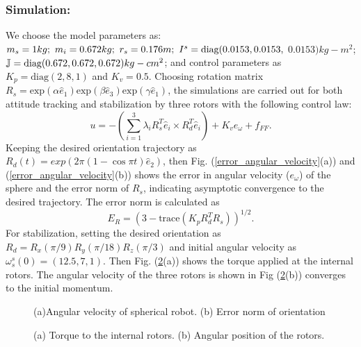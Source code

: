 \documentclass{ifacconf}
\begin{document}
\subsubsection*{Simulation:}
\label{section_simu}
We choose the model parameters as: $m_{s} = 1kg;~ m_{i}= 0.672kg;~ r_s = 0.176m;~I^{s} = \hbox{diag}(0.0153,0.0153,$ $0.0153)kg-m^{2}$; $\mathbb{J}= \hbox{diag}(0.672,0.672,0.672)kg-cm^{2}$;
and control parameters as $K_{p} = \mbox{diag}(2,8,1)$ and $K_{v} = 0.5$. Choosing rotation matrix $R_{s}=\mbox{exp}(\alpha \hat{e}_{1})\mbox{exp}(\beta \hat{e}_{3})\mbox{exp}(\gamma \hat{e}_{1})$, the simulations are carried out for both attitude tracking and stabilization by three rotors with the following control law:
$$u = -(\sum_{i=1}^{3} \lambda_{i}R_{s}^{T}\hat{e}_{i} \times R_{d}^{T}\hat{e}_{i}) + K_{v}e_{\omega} + f_{FF}.$$ 
Keeping the desired orientation trajectory as $R_{d}(t) = exp(2 \pi (1 - \cos \pi t)\hat{e}_{2})$, then Fig. (\ref{error_angular_velocity}(a)) and (\ref{error_angular_velocity}(b)) shows the error in angular velocity ($e_{\omega}$) of the sphere and the error norm of $R_{s}$, indicating asymptotic convergence to the desired trajectory. The error norm is calculated as $$E_{R} = (3 - \mbox{trace}(K_{p}R_{d}^{T}R_{s}))^{1/2}.$$ 
For stabilization, setting the desired orientation as $R_{d}=R_{x}(\pi/9)R_{y}(\pi/18)R_{z}(\pi/3)$ and initial angular velocity as $\omega_{s}^{s}(0) = (12.5,7,1)$. Then Fig. (\ref{control}(a)) shows the torque applied at the internal rotors. The angular velocity of the three rotors is shown in Fig (\ref{control}(b)) converges to the initial momentum.
\begin{figure}[h]
		\caption{(a)Angular velocity of spherical robot. (b) Error norm of orientation}				
				\label{angular_velocity}			
\end{figure}
\begin{figure}
		\caption{(a) Torque to the internal rotors. (b) Angular position of the rotors. }				
				\label{control}				
\end{figure}
\end{document}
